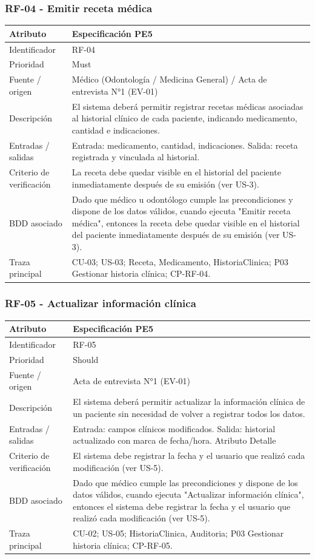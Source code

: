 \documentclass[11pt,a4paper]{article}
\begin{document}
	\subsubsection{RF-04 - Emitir receta médica}
	\begin{tabularx}{\textwidth}{p{3.2cm}Y}
		\toprule
		\textbf{Atributo} & \textbf{Especificación PE5}\\\midrule
		Identificador & RF-04\\
		Prioridad & Must\\
		Fuente / origen & Médico (Odontología / Medicina General) / Acta de entrevista N°1 (EV-01)\\
		Descripción & El sistema deberá permitir registrar recetas médicas asociadas al historial clínico de cada paciente, indicando medicamento, cantidad e indicaciones.\\
		Entradas / salidas & Entrada: medicamento, cantidad, indicaciones. Salida: receta registrada y vinculada al historial.\\
		Criterio de verificación & La receta debe quedar visible en el historial del paciente inmediatamente después de su emisión (ver US-3).\\
		BDD asociado & Dado que médico u odontólogo cumple las precondiciones y dispone de los datos válidos, cuando ejecuta "Emitir receta médica", entonces la receta debe quedar visible en el historial del paciente inmediatamente después de su emisión (ver US-3).\\
		Traza principal & CU-03; US-03; Receta, Medicamento, HistoriaClinica; P03 Gestionar historia clínica; CP-RF-04.\\
		\bottomrule
	\end{tabularx}
	\clearpage
	\subsubsection{RF-05 - Actualizar información clínica}
	\begin{tabularx}{\textwidth}{p{3.2cm}Y}
		\toprule
		\textbf{Atributo} & \textbf{Especificación PE5}\\\midrule
		Identificador & RF-05\\
		Prioridad & Should\\
		Fuente / origen & Acta de entrevista N°1 (EV-01)\\
		Descripción & El sistema deberá permitir actualizar la información clínica de un paciente sin necesidad de volver a registrar todos los datos.\\
		Entradas / salidas & Entrada: campos clínicos modificados. Salida: historial actualizado con marca de fecha/hora. Atributo Detalle\\
		Criterio de verificación & El sistema debe registrar la fecha y el usuario que realizó cada modificación (ver US-5).\\
		BDD asociado & Dado que médico cumple las precondiciones y dispone de los datos válidos, cuando ejecuta "Actualizar información clínica", entonces el sistema debe registrar la fecha y el usuario que realizó cada modificación (ver US-5).\\
		Traza principal & CU-02; US-05; HistoriaClinica, Auditoria; P03 Gestionar historia clínica; CP-RF-05.\\
		\bottomrule
	\end{tabularx}
\end{document}
